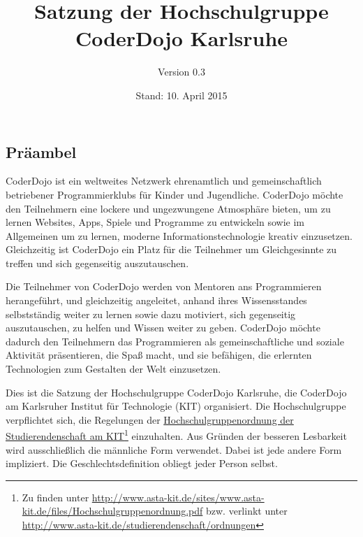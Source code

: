 \documentclass[a4paper, parskip=half, numbers=noenddot]{scrartcl}
\title{Satzung der Hochschulgruppe\\CoderDojo Karlsruhe}
\author{Version 0.3}
\date{Stand: 10. April 2015}
\begin{document}
%
%

\maketitle
\vfill
\begin{contract}

%
%

\tableofcontents
\vspace{2em}

%
%

\section*{Präambel}

CoderDojo ist ein weltweites Netzwerk ehrenamtlich und gemeinschaftlich
betriebener Programmierklubs für Kinder und Jugendliche.
CoderDojo möchte den Teilnehmern eine lockere und ungezwungene Atmosphäre
bieten, um zu lernen Websites, Apps, Spiele und Programme zu entwickeln sowie im
Allgemeinen um zu lernen, moderne Informationstechnologie kreativ einzusetzen.
Gleichzeitig ist CoderDojo ein Platz für die Teilnehmer um Gleichgesinnte zu
treffen und sich gegenseitig auszutauschen.

Die Teilnehmer von CoderDojo werden von Mentoren ans Programmieren herangeführt,
und gleichzeitig angeleitet, anhand ihres Wissensstandes selbstständig weiter zu
lernen sowie dazu motiviert, sich gegenseitig auszutauschen, zu helfen und
Wissen weiter zu geben.
CoderDojo möchte dadurch den Teilnehmern das Programmieren als gemeinschaftliche
und soziale Aktivität präsentieren, die Spaß macht, und sie befähigen, die
erlernten Technologien zum Gestalten der Welt einzusetzen.

Dies ist die Satzung der Hochschulgruppe CoderDojo Karlsruhe, die CoderDojo
am Karlsruher Institut für Technologie (KIT) organisiert.
Die Hochschulgruppe verpflichtet sich, die Regelungen der
\href{http://www.asta-kit.de/studierendenschaft/ordnungen}{Hochschulgruppenordnung der Studierendenschaft am KIT}\footnote{Zu finden unter \url{http://www.asta-kit.de/sites/www.asta-kit.de/files/Hochschulgruppenordnung.pdf} bzw. verlinkt unter \url{http://www.asta-kit.de/studierendenschaft/ordnungen}} einzuhalten.
Aus Gründen der besseren Lesbarkeit wird ausschließlich die männliche Form
verwendet. Dabei ist jede andere Form impliziert. Die Geschlechtsdefinition
obliegt jeder Person selbst.
\newpage


\end{contract}
\end{document}
